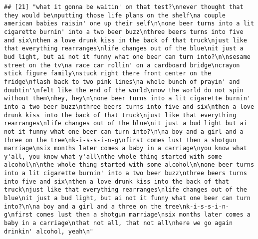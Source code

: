 \documentclass[]{article}
\begin{document}
\begin{verbatim}
## [21] "what it gonna be waitin' on that test?\nnever thought that they would be\nputting those life plans on the shelf\na couple american babies raisin' one up their self\n\none beer turns into a lit cigarette burnin' into a two beer buzz\nthree beers turns into five and six\nthen a love drunk kiss in the back of that truck\njust like that everything rearranges\nlife changes out of the blue\nit just a bud light, but ai not it funny what one beer can turn into?\n\nsesame street on the tv\na race car rollin' on a cardboard bridge\ncrayon stick figure family\nstuck right there front center on the fridge\nflash back to two pink lines\na whole bunch of prayin' and doubtin'\nfelt like the end of the world\nnow the world do not spin without them\nhey, hey\n\none beer turns into a lit cigarette burnin' into a two beer buzz\nthree beers turns into five and six\nthen a love drunk kiss into the back of that truck\njust like that everything rearranges\nlife changes out of the blue\nit just a bud light but ai not it funny what one beer can turn into?\n\na boy and a girl and a three on the tree\nk-i-s-s-i-n-g\nfirst comes lust then a shotgun marriage\nsix months later comes a baby in a carriage\nyou know what y'all, you know what y'all\nthe whole thing started with some alcohol\n\nthe whole thing started with some alcohol\n\none beer turns into a lit cigarette burnin' into a two beer buzz\nthree beers turns into five and six\nthen a love drunk kiss into the back of that truck\njust like that everything rearranges\nlife changes out of the blue\nit just a bud light, but ai not it funny what one beer can turn into?\n\na boy and a girl and a three on the tree\nk-i-s-s-i-n-g\nfirst comes lust then a shotgun marriage\nsix months later comes a baby in a carriage\nthat not all, that not all\nhere we go again drinkin' alcohol, yeah\n"                                                                                                                                                                                                                                                                                                                                                                                                                                                                                                                                                                                                                                                                                                                                                                                                                                                                                                                                                                                                                                                                      

\end{verbatim}
\end{document}
